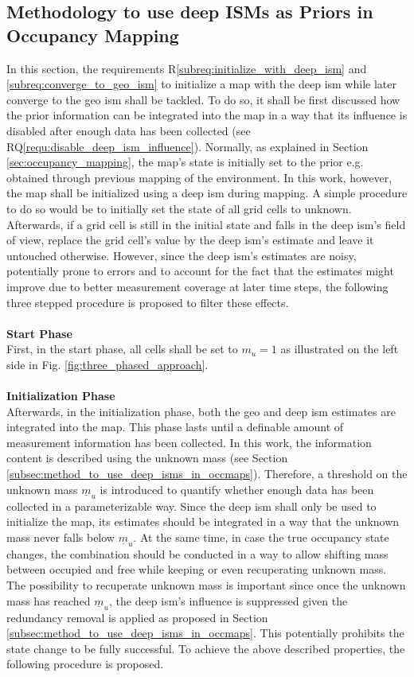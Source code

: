 \subsection{Methodology to use deep ISMs as Priors in Occupancy Mapping}
\label{subsec:method_to_use_deep_isms_as_priors_in_occmaps}
In this section, the requirements R\ref{subreq:initialize_with_deep_ism} and \ref{subreq:converge_to_geo_ism} to initialize a map with the deep \gls{ism} while later converge to the geo \gls{ism} shall be tackled. To do so, it shall be first discussed how the prior information can be integrated into the map in a way that its influence is disabled after enough data has been collected (see RQ\ref{requ:disable_deep_ism_influence}). Normally, as explained in Section \ref{sec:occupancy_mapping}, the map's state is initially set to the prior e.g. obtained through previous mapping of the environment. In this work, however, the map shall be initialized using a deep \gls{ism} during mapping. A simple procedure to do so would be to initially set the state of all grid cells to unknown. Afterwards, if a grid cell is still in the initial state and falls in the deep \gls{ism}'s field of view, replace the grid cell's value by the deep \gls{ism}'s estimate and leave it untouched otherwise. However, since the deep \gls{ism}'s estimates are noisy, potentially prone to errors and to account for the fact that the estimates might improve due to better measurement coverage at later time steps, the following three stepped procedure is proposed to filter these effects. 
\\\\
\textbf{Start Phase}\\
First, in the start phase, all cells shall be set to $m_u = 1$ as illustrated on the left side in Fig. \ref{fig:three_phased_approach}. 
\\\\
\textbf{Initialization Phase}\\
Afterwards, in the initialization phase, both the geo and deep \gls{ism} estimates are integrated into the map. This phase lasts until a definable amount of measurement information has been collected. In this work, the information content is described using the unknown mass (see Section \ref{subsec:method_to_use_deep_isms_in_occmaps}). Therefore, a threshold on the unknown mass $\underline{m}_u$ is introduced to quantify whether enough data has been collected in a parameterizable way. Since the deep \gls{ism} shall only be used to initialize the map, its estimates should be integrated in a way that the unknown mass never falls below $\underline{m}_u$. At the same time, in case the true occupancy state changes, the combination should be conducted in a way to allow shifting mass between occupied and free while keeping or even recuperating unknown mass. The possibility to recuperate unknown mass is important since once the unknown mass has reached $\underline{m}_u$, the deep \gls{ism}'s influence is suppressed given the redundancy removal is applied as proposed in Section \ref{subsec:method_to_use_deep_isms_in_occmaps}. This potentially prohibits the state change to be fully successful. To achieve the above described properties, the following procedure is proposed.
